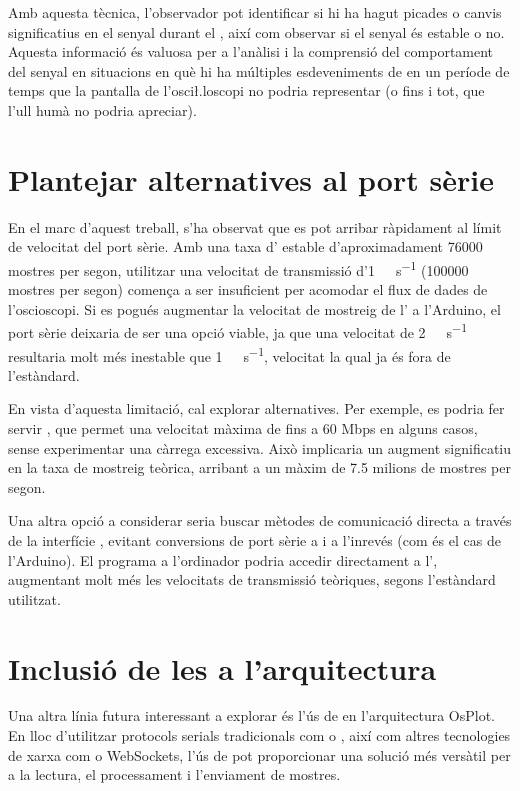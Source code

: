 \documentclass{tfgitic}[2023/06/30]
\begin{document}
Amb aquesta tècnica, l'observador pot identificar si hi ha hagut
picades o canvis significatius en el senyal durant el ,
així com observar si el senyal és estable o no. Aquesta informació és
valuosa per a l'anàlisi i la comprensió del comportament del senyal en
situacions en què hi ha múltiples esdeveniments de  en un
període de temps que la pantalla de l'osci\l.loscopi no podria
representar (o fins i tot, que l'ull humà no podria apreciar).

\section{Plantejar alternatives al port sèrie}

En el marc d'aquest treball, s'ha observat que es pot arribar
ràpidament al límit de velocitat del port sèrie. Amb una taxa
d' estable d'aproximadament \num{76000} mostres per segon,
utilitzar una velocitat de transmissió d'\SI{1}{\mega\bit\per\second}
(\num{100000} mostres per segon) comença a ser insuficient per
acomodar el flux de dades de l'osci\lgem oscopi. Si es pogués
augmentar la velocitat de mostreig de l' a l'Arduino, el
port sèrie deixaria de ser una opció viable, ja que una velocitat de
\SI{2}{\mega\bit\per\second} resultaria molt més inestable que
\SI{1}{\mega\bit\per\second}, velocitat la qual ja és fora de
l'estàndard.

En vista d'aquesta limitació, cal explorar alternatives. Per exemple,
es podria fer servir , que permet una velocitat màxima de
fins a 60 Mbps en alguns casos, sense experimentar una càrrega
excessiva. Això implicaria un augment significatiu en la taxa de
mostreig teòrica, arribant a un màxim de \num{7.5} milions de mostres
per segon.

Una altra opció a considerar seria buscar mètodes de comunicació
directa a través de la interfície , evitant conversions de
port sèrie a  i a l'inrevés (com és el cas de l'Arduino). El
programa a l'ordinador podria accedir directament a l',
augmentant molt més les velocitats de transmissió teòriques, segons
l'estàndard  utilitzat.

\section{Inclusió de les  a l'arquitectura}

Una altra línia futura interessant a explorar és l'ús de \cite[Ràdio
  Definida per Software]{viqui-SDR} en l'arquitectura OsPlot. En lloc
d'utilitzar protocols serials tradicionals com  o
, així com altres tecnologies de xarxa com  o
WebSockets, l'ús de  pot proporcionar una solució més
versàtil per a la lectura, el processament i l'enviament de mostres.
\end{document}
